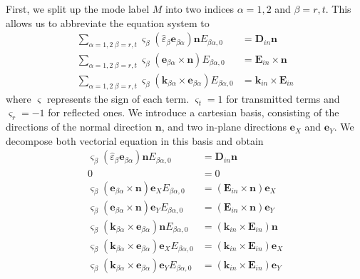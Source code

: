 \documentclass[12pt,a4paper,twoside,openright,BCOR10mm,headsepline,titlepage,abstracton,chapterprefix,final]{scrreprt}
\newcommand\Vector[1]{{\mathbf{#1}}}
\newcommand\wavenumber{k}
\newcommand\Wavevector{\Vector{\wavenumber}}
\newcommand\Tensor[1]{\hat{#1}}
\newcommand\scalarEfield{E}
\newcommand\scalarDfield{D}
\newcommand\Efield{\Vector{\scalarEfield}}
\newcommand\Dfield{\Vector{\scalarDfield}}
\newcommand\permittivity{\Tensor{\scalarpermittivity}}
\newcommand\scalarpermittivity{\varepsilon}
\begin{document}
First, we split up the mode label $M$ into two indices $\alpha=1,2$ and $\beta=r,t$.
This allows us to abbreviate the equation system to
\begin{subequations}
  \begin{align}
    \sum_{\alpha=1,2\;\beta=r,t} \varsigma_\beta (\permittivity_\beta \Vector{e}_{\beta\alpha})\Vector{n} E_{\beta\alpha,0} &= \Dfield_{in} \Vector{n}                   \label{eq:FresnelSystemEq1} \\
    \sum_{\alpha=1,2\;\beta=r,t} \varsigma_\beta (\Vector{e}_{\beta\alpha} \times \Vector{n} ) E_{\beta\alpha,0} &= \Efield_{in} \times \Vector{n}                        \label{eq:FresnelSystemEq2} \\
    \sum_{\alpha=1,2\;\beta=r,t} \varsigma_\beta ( \Wavevector_{\beta\alpha} \times \Vector{e}_{\beta\alpha} ) E_{\beta\alpha,0} &=  \Wavevector_{in} \times \Efield_{in} \label{eq:FresnelSystemEq3}
  \end{align}
\end{subequations}
where $\varsigma$ represents the sign of each term.
$\varsigma_t=1$ for transmitted terms and $\varsigma_r=-1$ for reflected ones.
We introduce a cartesian basis, 
consisting of the directions of the normal direction $\Vector{n}$, 
and two in-plane directions $\Vector{e}_X$ and $\Vector{e}_Y$.
We decompose both vectorial equation in this basis and obtain
\begin{subequations}
  \begin{align}
    \varsigma_\beta (\permittivity_\beta \Vector{e}_{\beta\alpha})\Vector{n} E_{\beta\alpha,0} &= \Dfield_{in} \Vector{n} \\
    0 &= 0 \\
    \varsigma_\beta (\Vector{e}_{\beta\alpha} \times \Vector{n} ) \Vector{e}_X E_{\beta\alpha,0} &= (\Efield_{in} \times \Vector{n}) \Vector{e}_X \\
    \varsigma_\beta (\Vector{e}_{\beta\alpha} \times \Vector{n} ) \Vector{e}_Y E_{\beta\alpha,0} &= (\Efield_{in} \times \Vector{n}) \Vector{e}_Y \\
    \varsigma_\beta ( \Wavevector_{\beta\alpha} \times \Vector{e}_{\beta\alpha} ) \Vector{n} E_{\beta\alpha,0} &= (\Wavevector_{in} \times \Efield_{in})\Vector{n} \label{eq:fresnelTripleProductSubEq}\\
    \varsigma_\beta ( \Wavevector_{\beta\alpha} \times \Vector{e}_{\beta\alpha} ) \Vector{e}_X E_{\beta\alpha,0} &= (\Wavevector_{in} \times \Efield_{in}) \Vector{e}_X \\
    \varsigma_\beta ( \Wavevector_{\beta\alpha} \times \Vector{e}_{\beta\alpha} ) \Vector{e}_Y E_{\beta\alpha,0} &= (\Wavevector_{in} \times \Efield_{in}) \Vector{e}_Y
  \end{align}
\end{subequations}
\end{document}
